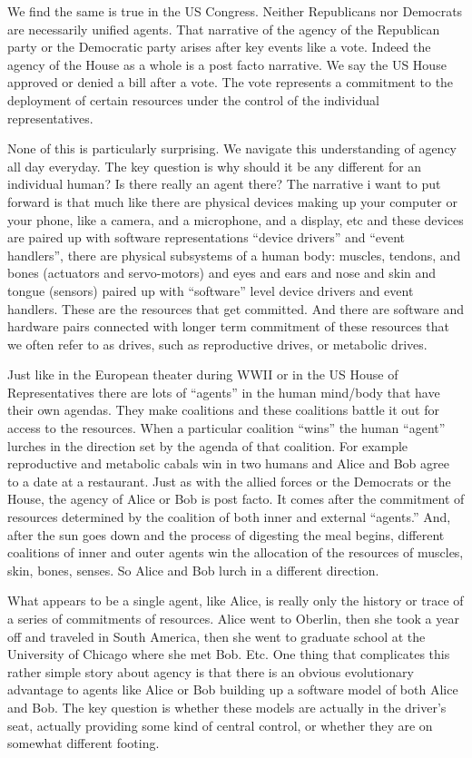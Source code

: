 We find the same is true in the US Congress. Neither Republicans nor Democrats are necessarily unified agents. That narrative of the agency of the Republican party or the Democratic party arises after key events like a vote. Indeed the agency of the House as a whole is a post facto narrative. We say the US House approved or denied a bill after a vote. The vote represents a commitment to the deployment of certain resources under the control of the individual representatives.

None of this is particularly surprising. We navigate this understanding of agency all day everyday. The key question is why should it be any different for an individual human? Is there really an agent there? The narrative i want to put forward is that much like there are physical devices making up your computer or your phone, like a camera, and a microphone, and a display, etc and these devices are paired up with software representations ``device drivers'' and ``event handlers'', there are physical subsystems of a human body: muscles, tendons, and bones (actuators and servo-motors) and eyes and ears and nose and skin and tongue (sensors) paired up with ``software'' level device drivers and event handlers. These are the resources that get committed. And there are software and hardware pairs connected with longer term commitment of these resources that we often refer to as drives, such as reproductive drives, or metabolic drives. 

Just like in the European theater during WWII or in the US House of Representatives there are lots of ``agents'' in the human mind/body that have their own agendas. They make coalitions and these coalitions battle it out for access to the resources. When a particular coalition ``wins'' the human ``agent'' lurches in the direction set by the agenda of that coalition. For example reproductive and metabolic cabals win in two humans and Alice and Bob agree to a date at a restaurant. Just as with the allied forces or the Democrats or the House, the agency of Alice or Bob is post facto. It comes after the commitment of resources determined by the coalition of both inner and external ``agents.'' And, after the sun goes down and the process of digesting the meal begins, different coalitions of inner and outer agents win the allocation of the resources of muscles, skin, bones, senses. So Alice and Bob lurch in a different direction.

What appears to be a single agent, like Alice, is really only the history or trace of a series of commitments of resources. Alice went to Oberlin, then she took a year off and traveled in South America, then she went to graduate school at the University of Chicago where she met Bob. Etc. One thing that complicates this rather simple story about agency is that there is an obvious evolutionary advantage to agents like Alice or Bob building up a software model of both Alice and Bob. The key question is whether these models are actually in the driver's seat, actually providing some kind of central control, or whether they are on somewhat different footing.

